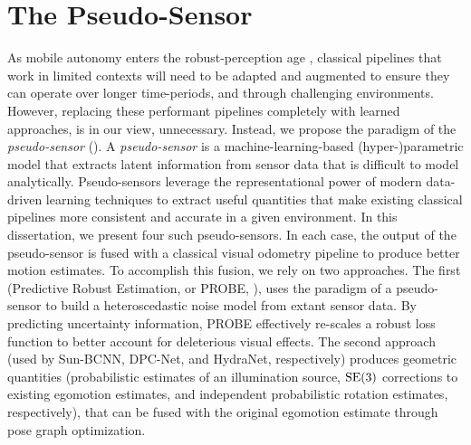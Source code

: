 \section{The Pseudo-Sensor}

As mobile autonomy enters the robust-perception age \citep{Cadena2016-ds}, classical pipelines that work in limited contexts will need to be adapted and augmented to ensure they can operate over longer time-periods, and through challenging environments. However, replacing these performant pipelines completely with learned approaches, is in our view, unnecessary. Instead, we propose the paradigm of the  \textit{pseudo-sensor} (). A \textit{pseudo-sensor} is a machine-learning-based (hyper-)parametric model that extracts latent information from sensor data that is difficult to model analytically. Pseudo-sensors leverage the representational power of modern data-driven learning techniques to extract useful quantities that make existing classical pipelines more consistent and accurate in a given environment. In this dissertation, we present four such pseudo-sensors. In each case, the output of the pseudo-sensor is fused with a classical visual odometry pipeline to produce better motion estimates. To accomplish this fusion, we rely on two approaches. The first (Predictive Robust Estimation, or PROBE, ), uses the paradigm of a pseudo-sensor to build a heteroscedastic noise model from extant sensor data. By predicting uncertainty information, PROBE effectively re-scales a robust loss function to better account for deleterious visual effects. The second approach (used by Sun-BCNN, DPC-Net, and HydraNet,   respectively) produces geometric quantities (probabilistic estimates of an illumination source, $\mathrm{SE}(3)$ corrections to existing egomotion estimates, and independent probabilistic rotation estimates, respectively), that can be fused with the original egomotion estimate through pose graph optimization.


